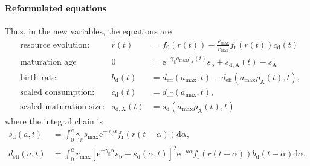 \documentclass[11pt]{scrartcl}
\renewcommand{\phi}{\varphi}
\newcommand{\e}{\mathrm{e}}
\renewcommand{\d}{\mathrm{d}}
\newcommand{\bd}{b_\mathrm{d}}
\newcommand{\cd}{c_\mathrm{d}}
\newcommand{\sd}{s_\mathrm{d}}
\newcommand{\fr}{f_\mathrm{r}}
\newcommand{\rmax}{r_\mathrm{max}}
\newcommand{\amax}{{a_\mathrm{max}}}
\newcommand{\szmax}{{s_\mathrm{max}}}
\newcommand{\fmax}{\phi_\mathrm{max}}
\newcommand{\sda}{s_\mathrm{d,A}}
\newcommand{\sza}{s_\mathrm{A}}
\newcommand{\szb}{s_\mathrm{b}}
\newcommand{\ra}{\rho_\mathrm{A}}
\newcommand{\deff}{d_\mathrm{eff}}
\renewcommand{\gg}{\gamma_\mathrm{g}}
\begin{document}
\paragraph{Reformulated equations}
Thus, in the new variables, the equations are
\begin{align}
  &\mbox{resource evolution:}&\dot r(t)&=f_0(r(t))-\frac{\fmax}{\rmax}\fr(r(t))\cd(t)\label{ref:r}\\
    &\mbox{maturation age}&0&=\e^{-\gg\amax\ra(t)}\szb+\sda(t)-\sza\label{ref:sda}\\
  &\mbox{birth rate:}&\bd(t)&=\deff(\amax,t)-\deff(\amax\ra(t),t),\label{ref:bd}\\
  &\mbox{scaled consumption:} &\cd(t)&=\deff(\amax,t),\label{ref:cd}\\
  &\mbox{scaled maturation size:}&\sda(t)&=\sd(\amax\ra(t),t)\label{ref:sda}
\end{align}
  where the integral chain is
\begin{align}
  \sd(a,t)&=\int_0^a\gg\szmax\e^{-\gg \alpha}\fr(r(t-\alpha))\d \alpha,\label{ref:sd}\\
  \deff(a,t)&=\int_0^a\rmax\left[\e^{-\gg \alpha}\szb+\sd(\alpha,t)\right]^2\e^{-\mu \alpha}\fr(r(t-\alpha))\bd(t-\alpha)\d \alpha.\label{ref:deff}  
\end{align}
\end{document}
